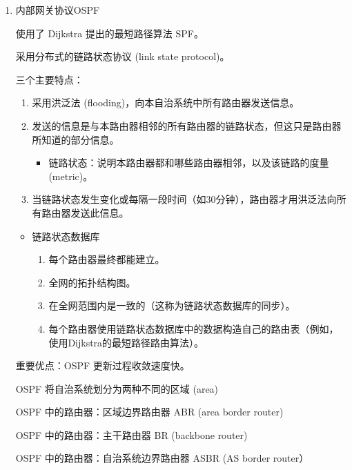 \documentclass[11pt]{article}
\begin{document}
\begin{enumerate}
\begin{enumerate}
\item 内部网关协议OSPF
\label{sec:org5e5b9ac}

使用了 Dijkstra 提出的最短路径算法 SPF。

采用分布式的链路状态协议 (link state protocol)。

三个主要特点：
\begin{enumerate}
\item 采用洪泛法 (flooding)，向本自治系统中所有路由器发送信息。
\item 发送的信息是与本路由器相邻的所有路由器的链路状态，但这只是路由器所知道的部分信息。
\begin{itemize}
\item 链路状态：说明本路由器都和哪些路由器相邻，以及该链路的度量 (metric)。
\end{itemize}
\item 当链路状态发生变化或每隔一段时间（如30分钟），路由器才用洪泛法向所有路由器发送此信息。
\end{enumerate}


\begin{itemize}
\item 链路状态数据库
\begin{enumerate}
\item 每个路由器最终都能建立。
\item 全网的拓扑结构图。
\item 在全网范围内是一致的（这称为链路状态数据库的同步）。
\item 每个路由器使用链路状态数据库中的数据构造自己的路由表（例如，使用Dijkstra的最短路径路由算法）。
\end{enumerate}
\end{itemize}

重要优点：OSPF 更新过程收敛速度快。

OSPF 将自治系统划分为两种不同的区域 (area)

OSPF 中的路由器：区域边界路由器 ABR (area border router)

OSPF 中的路由器：主干路由器 BR (backbone router)

OSPF 中的路由器：自治系统边界路由器 ASBR (AS border router）


\end{enumerate}
\end{enumerate}
\end{document}
